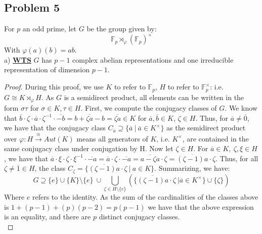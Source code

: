 \documentclass{article}
\newcommand{\bb}[1]{\mathbb{#1}}
\newcommand{\iso}{\cong}
\begin{document}
\subsection*{Problem 5}
For $p$ an odd prime, let $G$ be the group given by:
\[
  \bb{F}_{p} \rtimes_{\varphi}(\bb{F}_{p})^{\times}
\]
With $\varphi(a)(b) = ab$. \\

a) \textbf{\underline{WTS}} $G$ has $p-1$ complex abelian representations and one irreducible representation of dimension $p-1$.

\begin{proof}
  During this proof, we use $K$ to refer to $\bb{F}_{p}$, $H$ to refer to $\bb{F}_{p}^{\times}$: i.e. $G \iso K \rtimes_{\varphi} H$. As $G$ is a semidirect product, all elements can be written in the form $\sigma \tau$ for $\sigma \in K, \tau \in H$. First, we compute the conjugacy classes of $G$. We know that $\overline b \cdot \zeta \cdot \overline a \cdot \zeta^{-1}\cdot \overline{-b} = \overline{b + \zeta a -b} = \overline{\zeta a} \in K$ for $\overline a, \overline b \in K$, $\zeta \in H$. Thus, for $\overline a \neq \overline 0$, we have that the conjugacy class $C_{\overline a} \supseteq \{\overline a \ | \ \overline a \in K^{\times}\}$ as the semidirect product over $\varphi: H \xrightarrow{\iso} Aut(K)$ means all generators of $K$, i.e. $K^{\times}$, are contained in the same conjugacy class under conjugation by H. Now let $\zeta \in H$. For $\overline a \in K, \ \zeta, \xi \in H$, we have that $\overline a \cdot \xi \cdot \zeta \cdot \xi^{-1} \cdot \overline{-a} = \overline a \cdot \zeta \cdot \overline{-a} = \overline{a - \zeta a} \cdot \zeta = \overline{(\zeta - 1)a} \cdot \zeta$. Thus, for all $\zeta \neq \overline{1} \in H$, the class $C_{\zeta} = \{\overline{(\zeta - 1)a} \cdot \zeta \ | \ a \in K \}$. Summarizing, we have:
  \[
    G \supseteq \{e\} \cup \{K\} \setminus \{e\} \ \cup \bigcup_{\zeta \in H \setminus \{e\}}\left(\{\overline{(\zeta-1)a} \cdot \zeta \ | \overline{a} \in K^{\times}\} \cup \{\zeta\}\right) 
    \]
    Where $e$ refers to the identity. As the sum of the cardinalities of the classes above is $1 + (p-1) + (p)(p-2) = p(p-1)$ we have that the above expression is an equality, and there are $p$ distinct conjugacy classes. \\
    

\end{proof}
\end{document}
